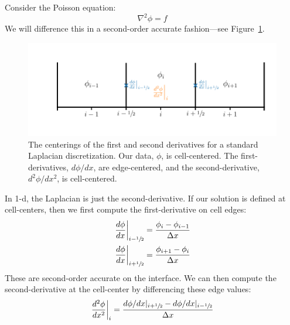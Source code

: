 Consider the Poisson equation:
\begin{equation}
\nabla^2 \phi = f
\end{equation}
We will difference this in a second-order accurate fashion---see
Figure~\ref{fig:mg:laplacian}.  
\begin{figure}[t]
\centering
\includegraphics[width=\linewidth]{laplacian}
\caption[Data centerings for the discrete Laplacian]{\label{fig:mg:laplacian} The centerings of the first and second
derivatives for a standard Laplacian discretization.  Our data, $\phi$,
is cell-centered.  The first-derivatives, $d\phi/dx$, are edge-centered, and the
second-derivative, $d^2\phi/dx^2$, is cell-centered.}
\end{figure}
%
In 1-d, the Laplacian is just the second-derivative.  If our solution
is defined at cell-centers, then we first compute the first-derivative
on cell edges:
\begin{align}
\left . \frac{d\phi}{dx} \right |_{i-{\sfrac{1}{2}}} &= \frac{\phi_i - \phi_{i-1}}{\Delta x}\\
\left . \frac{d\phi}{dx} \right |_{i+{\sfrac{1}{2}}} &= \frac{\phi_{i+1} - \phi_i}{\Delta x}
\end{align}
These are second-order accurate on the interface.  We can then compute
the second-derivative at the cell-center by differencing these edge values:
\begin{equation}
\left . \frac{d^2\phi}{dx^2} \right |_i = \frac{ d\phi/dx |_{i+{\sfrac{1}{2}}} - d\phi/dx |_{i-{\sfrac{1}{2}}}}{\Delta x}
\end{equation}

